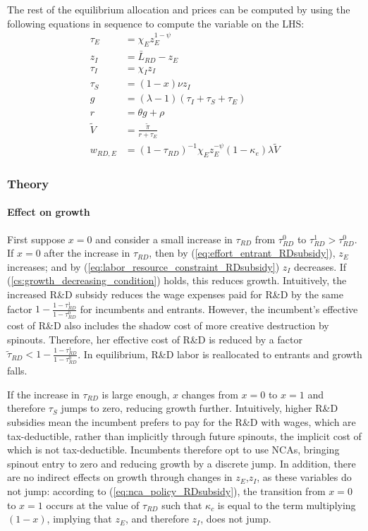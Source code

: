 \documentclass[11pt,english]{article}
\theoremstyle{remark}
\begin{document}
The rest of the equilibrium allocation and prices can be computed by using the following equations in sequence to compute the variable on the LHS:
\begin{align}
	\tau_E &= \chi_E z_E^{1-\psi} \\
	z_I &= \bar{L}_{RD} - z_E \label{eq:labor_resource_constraint_RDsubsidy}\\ 
	\tau_I &= \chi_I z_I \\
	\tau_S &= (1-x) \nu z_I \\
	g &= (\lambda - 1) (\tau_I + \tau_S + \tau_E) \\
	r &= \theta g + \rho \\
	\tilde{V} &= \frac{\tilde{\pi}}{r + \tau_E} \\ 
	w_{RD,E} &= (1-\tau_{RD})^{-1}\chi_E z_E^{-\psi} (1-\kappa_e) \lambda \tilde{V} \label{eq:wage_rd_labor_RDsubsidy}
\end{align}

\subsubsection{Theory}

\paragraph{Effect on growth}

First suppose $x = 0$ and consider a small increase in $\tau_{RD}$ from $\tau_{RD}^0$ to $\tau_{RD}^1 > \tau_{RD}^0$. If $x = 0$ after the increase in $\tau_{RD}$, then by (\ref{eq:effort_entrant_RDsubsidy}), $z_E$ increases; and by (\ref{eq:labor_resource_constraint_RDsubsidy}) $z_I$ decreases. If (\ref{cs:growth_decreasing_condition}) holds, this reduces growth. Intuitively, the increased R\&D subsidy reduces the wage expenses paid for R\&D by the same factor $1-\frac{1-\tau_{RD}^1}{1-\tau_{RD}^0}$ for incumbents and entrants. However, the incumbent's effective cost of R\&D also includes the shadow cost of more creative destruction by spinouts. Therefore, her effective cost of R\&D is reduced by a factor $\tilde{\tau}_{RD} < 1-\frac{1-\tau_{RD}^1}{1-\tau_{RD}^0}$. In equilibrium, R\&D labor is reallocated to entrants and growth falls.

If the increase in $\tau_{RD}$ is large enough, $x$ changes from $x = 0$ to $x = 1$ and therefore $\tau_S$ jumps to zero, reducing growth further. Intuitively, higher R\&D subsidies mean the incumbent prefers to pay for the R\&D with wages, which are tax-deductible, rather than implicitly through future spinouts, the implicit cost of which is not tax-deductible. Incumbents therefore opt to use NCAs, bringing spinout entry to zero and reducing growth by a discrete jump. In addition, there are no indirect effects on growth through changes in $z_E$,$z_I$, as these variables do not jump: according to (\ref{eq:nca_policy_RDsubsidy}), the transition from $x= 0$ to $x =1$ occurs at the value of $\tau_{RD}$ such that $\kappa_c$ is equal to the term multiplying $(1-x)$, implying that $z_E$, and therefore $z_I$, does not jump.
\end{document}
